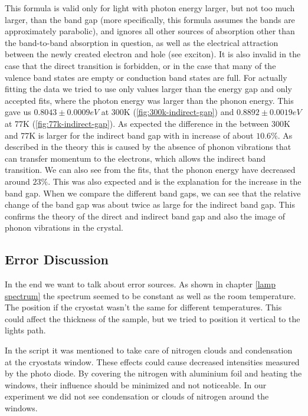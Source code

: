 \documentclass[]{article}
\begin{document}
This formula is valid only for light with photon energy larger, but not too much larger, than the band gap (more specifically, this formula assumes the bands are approximately parabolic), and ignores all other sources of absorption other than the band-to-band absorption in question, as well as the electrical attraction between the newly created electron and hole (see exciton). It is also invalid in the case that the direct transition is forbidden, or in the case that many of the valence band states are empty or conduction band states are full.\cite{absformular}
For actually fitting the data we tried to use only values larger than the energy gap and only accepted fits, where the photon energy was larger than the phonon energy. This gave us $0.8043 \pm 0.0009 eV$ at 300K (\ref{fig:300k-indirect-gap}) and $0.8892 \pm 0.0019 eV$ at 77K (\ref{fig:77k-indirect-gap}). As expected the difference in the between 300K and 77K is larger for the indirect band gap with in increase of about $10.6\%$. As described in the theory this is caused by the absence of phonon vibrations that can transfer momentum to the electrons, which allows the indirect band transition. We can also see from the fits, that the phonon energy have decreased around $23\%$. This was also expected and is the explanation for the increase in the band gap.
When we compare the different band gaps, we can see that the relative change of the band gap was about twice as large for the indirect band gap. This confirms the theory of the direct and indirect band gap and also the image of phonon vibrations in the crystal.







\subsection{Error Discussion} \label{Conclusion}
In the end we want to talk about error sources. As shown in chapter \ref{lamp spectrum} the spectrum seemed to be constant as well as the room temperature. The position if the cryostat wasn't the same for different temperatures. This could affect the thickness of the sample, but we tried to position it vertical to the lights path. 

In the script it was mentioned to take care of nitrogen clouds and condensation at the cryostats window. These effects could cause decreased intensities measured by the photo diode. By covering the nitrogen with aluminium foil and heating the windows, their influence should be minimized and not noticeable. In our experiment we did not see condensation or clouds of nitrogen around the windows.
\end{document}
